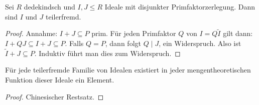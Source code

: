 \documentclass[ngerman, 11pt, a4paper, twoside, abstracton]{scrartcl}
\begin{document}
\begin{lemma}
  Sei $R$ dedekindsch und $I, J \le R$ Ideale mit disjunkter Primfaktorzerlegung. Dann sind $I$ und $J$ teilerfremd.
\end{lemma}
\begin{proof}
  Annahme: $I + J \subseteq P$ prim. Für jeden Primfaktor $Q$ von $I = Q\tilde{I}$ gilt dann: $I + QJ \subseteq I + J \subseteq P$. Falls $Q = P$, dann folgt $Q \mid J$, ein Widerspruch. Also ist $\tilde{I} + J \subseteq P$. Induktiv führt man dies zum Widerspruch.
\end{proof}

\begin{lemma}
  Für jede teilerfremde Familie von Idealen existiert in jeder mengentheoretischen Funktion dieser Ideale ein Element.
\end{lemma}
\begin{proof}
  Chinesischer Restsatz.
\end{proof}

\clearpage
\end{document}

